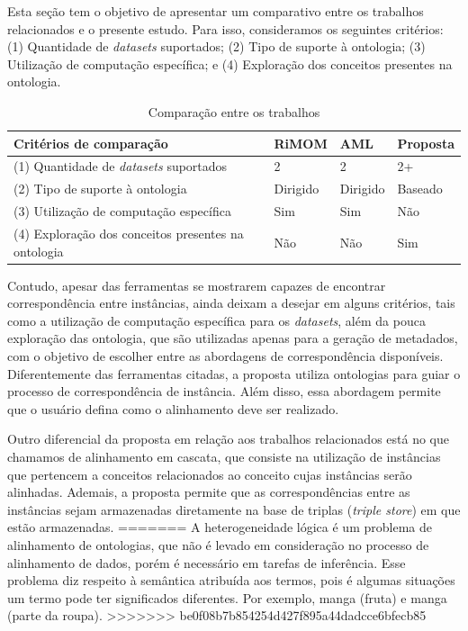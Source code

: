 Esta seção tem o objetivo de apresentar um comparativo entre os trabalhos relacionados e o presente estudo. Para isso, consideramos os seguintes critérios: (1) Quantidade de \textit{datasets} suportados; (2) Tipo de suporte à ontologia; (3) Utilização de computação específica; e (4) Exploração dos conceitos presentes na ontologia.

\begin{table}[h]
	\centering
	\caption{Comparação entre os trabalhos}
	\label{tab:comparacao}
	\begin{tabular}{@{}llll}
		\toprule
		\textbf{Critérios de comparação}                    & \textbf{RiMOM} & \textbf{AML} & \textbf{Proposta} \\ \midrule
		(1) Quantidade de \textit{datasets} suportados    & 2              & 2            & 2+                \\
		(2) Tipo de suporte à ontologia                     & Dirigido       & Dirigido     & Baseado           \\
		(3) Utilização de computação específica             & Sim            & Sim          & Não               \\
		(4) Exploração dos conceitos presentes na ontologia & Não            & Não          & Sim               \\ \bottomrule
	\end{tabular}
\end{table}

Contudo, apesar das ferramentas se mostrarem capazes de encontrar correspondência entre instâncias, ainda deixam a desejar em alguns critérios, tais como a utilização de computação específica para os \textit{datasets}, além da pouca exploração das ontologia, que são utilizadas apenas para a geração de metadados, com o objetivo de escolher entre as abordagens de correspondência disponíveis. Diferentemente das ferramentas citadas, a proposta utiliza ontologias para guiar o processo de correspondência de instância. Além disso, essa abordagem permite que o usuário defina como o alinhamento deve ser realizado.

Outro diferencial da proposta em relação aos trabalhos relacionados está no que chamamos de alinhamento em cascata, que consiste na utilização de instâncias que pertencem a conceitos relacionados ao conceito cujas instâncias serão alinhadas. Ademais, a proposta permite que as correspondências entre as instâncias sejam armazenadas diretamente na base de triplas (\textit{triple store}) em que estão armazenadas.
=======
% 
% 
%
%
A heterogeneidade lógica é um problema de alinhamento de ontologias, que não é levado em consideração no processo de alinhamento de dados, porém é necessário em tarefas de inferência. Esse problema diz respeito à semântica atribuída aos termos, pois é algumas situações um termo pode ter significados diferentes. Por exemplo, manga (fruta) e manga (parte da roupa).
>>>>>>> be0f08b7b854254d427f895a44dadcce6bfecb85
